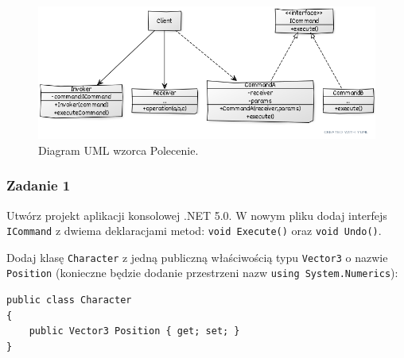 \begin{figure}[hbt!]
	\centering
	\includegraphics[width=0.9\linewidth]{images/CommandUml}
	\caption{Diagram UML wzorca Polecenie.}
	\label{lab4/fig/CommandUml}
\end{figure}
%

\subsubsection{Zadanie 1}
Utwórz projekt aplikacji konsolowej .NET 5.0. W nowym pliku dodaj interfejs \texttt{ICommand} z dwiema deklaracjami metod: \texttt{void Execute()} oraz \texttt{void Undo()}.

Dodaj klasę \texttt{Character} z jedną publiczną właściwością typu \texttt{Vector3} o nazwie \texttt{Position} (konieczne będzie dodanie przestrzeni nazw \texttt{using System.Numerics}):
\begin{lstlisting}
public class Character
{
	public Vector3 Position { get; set; }
}
\end{lstlisting}

